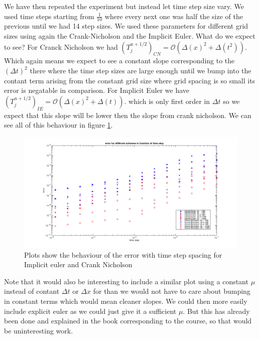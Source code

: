 \documentclass[ twoside,openright,titlepage,numbers=noenddot,headinclude,%
                footinclude=true,cleardoublepage=empty,abstractoff, %
                BCOR=5mm,paper=a4,fontsize=11pt,%
                ngerman,american,%
                ]{scrreprt}
\begin{document}
We have then repeated the experiment but instead let time step size vary. We used time steps starting from $\frac{1}{10}$ where every next one was half the size of the previous until we had 14 step sizes. We used these parameters for different grid sizes using again the Crank-Nicholson and the Implicit Euler. What do we expect to see? For Cranck Nicholson we had $(T_j^{n+1/2})_{CN} = \mathcal{O}(\Delta(x)^2 + \Delta(t^2))$. Which again means we expect to see a constant slope corresponding to the $(\Delta t)^2$ there where the time step sizes are large enough until we bump into the contant term arising from the constant grid size where grid spacing is so small its error is negatable in comparison. For Implicit Euler we have $(T_j^{n+1/2})_{IE} = \mathcal{O}(\Delta(x)^2 + \Delta(t))$. which is only first order in $\Delta t$ so we expect that this slope will be lower then the slope from crank nicholson. We can see all of this behaviour in figure \ref{errorDT}. 

\begin{figure}
\includegraphics[scale = 0.45]{images/errorDT}
\caption{Plots show the behaviour of the error with time step spacing for Implicit euler and Crank Nicholson}
\label{errorDT}
\end{figure}

Note that it would also be interesting to include a similar plot using a constant $\mu$ instead of contant $\Delta t$ or $\Delta x$ for than we would not have to care about bumping in constant terms which would mean cleaner slopes. We could then more easily include explicit euler as we could just give it a sufficient $\mu$. But this has already been done and explained in the book corresponding to the course, so that would be uninteresting work.
    
      

\end{document}

